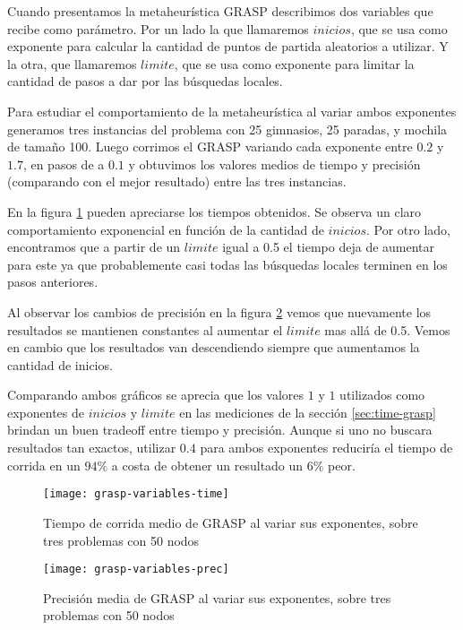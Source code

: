Cuando presentamos la metaheurística GRASP describimos dos variables que recibe como parámetro.
Por un lado la que llamaremos $inicios$, que se usa como exponente para calcular la cantidad de puntos de partida aleatorios a utilizar.
Y la otra, que llamaremos $limite$, que se usa como exponente para limitar la cantidad de pasos a dar por las búsquedas locales.

Para estudiar el comportamiento de la metaheurística al variar ambos exponentes generamos tres instancias del problema con 25 gimnasios,
25 paradas, y mochila de tamaño 100. Luego corrimos el GRASP variando cada exponente entre $0.2$ y $1.7$, en pasos de a $0.1$ y obtuvimos
los valores medios de tiempo y precisión (comparando con el mejor resultado) entre las tres instancias.

En la figura \ref{fig:grasp-variables-time} pueden apreciarse los tiempos obtenidos.
Se observa un claro comportamiento exponencial en función de la cantidad de $inicios$.
Por otro lado, encontramos que a partir de un $limite$ igual a 0.5 el tiempo deja de aumentar para este ya que
probablemente casi todas las búsquedas locales terminen en los pasos anteriores.

Al observar los cambios de precisión en la figura \ref{fig:grasp-variables-prec} vemos que nuevamente los resultados se mantienen constantes
al aumentar el $limite$ mas allá de 0.5. Vemos en cambio que los resultados van descendiendo siempre que aumentamos
la cantidad de inicios.

Comparando ambos gráficos se aprecia que los valores $1$ y $1$ utilizados como exponentes de $inicios$ y $limite$ en las mediciones
de la sección \ref{sec:time-grasp} brindan un buen tradeoff entre tiempo y precisión. Aunque si uno no buscara resultados tan exactos,
utilizar $0.4$ para ambos exponentes reduciría el tiempo de corrida en un $94\%$ a costa de obtener un resultado un $6\%$ peor.

\begin{figure}[H]
    \centering
    \texttt{[image: grasp-variables-time]}
    \caption{Tiempo de corrida medio de GRASP al variar sus exponentes, sobre tres problemas con 50 nodos}
    \label{fig:grasp-variables-time}
\end{figure}

\begin{figure}[H]
    \centering
    \texttt{[image: grasp-variables-prec]}
    \caption{Precisión media de GRASP al variar sus exponentes, sobre tres problemas con 50 nodos}
    \label{fig:grasp-variables-prec}
\end{figure}
